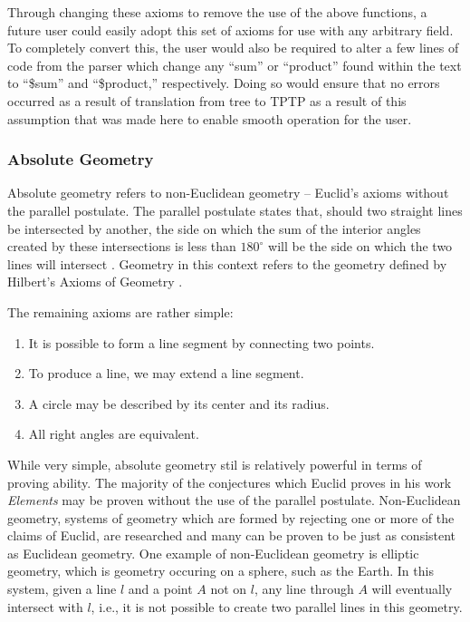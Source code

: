 Through changing these axioms to remove the use of the above functions, a future user could easily adopt this set of axioms for use with any arbitrary field. To completely convert this, the user would also be required to alter a few lines of code from the parser which change any ``sum'' or ``product'' found within the text to ``\$sum'' and ``\$product,'' respectively. Doing so would ensure that no errors occurred as a result of translation from tree to TPTP as a result of this assumption that was made here to enable smooth operation for the user.

\subsubsection{Absolute Geometry}

Absolute geometry refers to non-Euclidean geometry -- Euclid's axioms without the parallel postulate. The parallel postulate states that, should two straight lines be intersected by another, the side on which the sum of the interior angles created by these intersections is less than $180^{\circ}$ will be the side on which the two lines will intersect \cite{absolute}. Geometry in this context refers to the geometry defined by Hilbert's Axioms of Geometry \cite{geometry}.

The remaining axioms are rather simple:
\begin{enumerate}
	\item It is possible to form a line segment by connecting two points.
	\item To produce a line, we may extend a line segment.
	\item A circle may be described by its center and its radius.
	\item All right angles are equivalent.
\end{enumerate}

While very simple, absolute geometry stil is relatively powerful in terms of proving ability. The majority of the conjectures which Euclid proves in his work \textit{Elements} may be proven without the use of the parallel postulate. Non-Euclidean geometry, systems of geometry which are formed by rejecting one or more of the claims of Euclid, are researched and many can be proven to be just as consistent as Euclidean geometry. One example of non-Euclidean geometry is elliptic geometry, which is geometry occuring on a sphere, such as the Earth. In this system, given a line $l$ and a point $A$ not on $l$, any line through $A$ will eventually intersect with $l$, i.e., it is not possible to create two parallel lines in this geometry.

